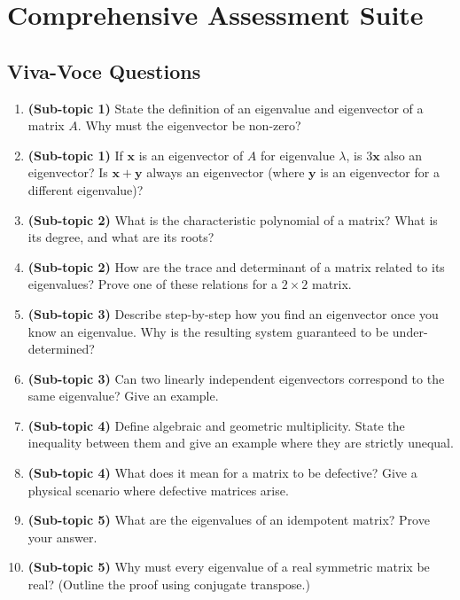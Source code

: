 \documentclass[12pt,a4paper]{article}
\begin{document}
\section{Comprehensive Assessment Suite}

\subsection*{Viva-Voce Questions}

\begin{enumerate}
  \item \textbf{(Sub-topic 1)} State the definition of an eigenvalue and eigenvector of a matrix $A$.
        Why must the eigenvector be non-zero?
  \item \textbf{(Sub-topic 1)} If $\mathbf{x}$ is an eigenvector of $A$ for eigenvalue $\lambda$,
        is $3\mathbf{x}$ also an eigenvector? Is $\mathbf{x} + \mathbf{y}$ always an eigenvector
        (where $\mathbf{y}$ is an eigenvector for a different eigenvalue)?
  \item \textbf{(Sub-topic 2)} What is the characteristic polynomial of a matrix? What is its degree,
        and what are its roots?
  \item \textbf{(Sub-topic 2)} How are the trace and determinant of a matrix related to its eigenvalues?
        Prove one of these relations for a $2\times 2$ matrix.
  \item \textbf{(Sub-topic 3)} Describe step-by-step how you find an eigenvector once you know an eigenvalue.
        Why is the resulting system guaranteed to be under-determined?
  \item \textbf{(Sub-topic 3)} Can two linearly independent eigenvectors correspond to the same eigenvalue?
        Give an example.
  \item \textbf{(Sub-topic 4)} Define algebraic and geometric multiplicity. State the inequality between them
        and give an example where they are strictly unequal.
  \item \textbf{(Sub-topic 4)} What does it mean for a matrix to be defective? Give a physical scenario
        where defective matrices arise.
  \item \textbf{(Sub-topic 5)} What are the eigenvalues of an idempotent matrix? Prove your answer.
  \item \textbf{(Sub-topic 5)} Why must every eigenvalue of a real symmetric matrix be real?
        (Outline the proof using conjugate transpose.)
\end{enumerate}
\end{document}
